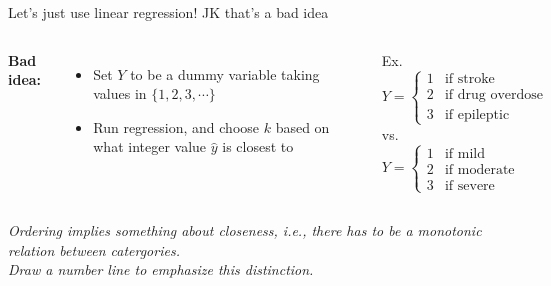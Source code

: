 \documentclass[aspectratio=169,usenames,dvipsnames]{beamer}
\newcommand{\InstructorNotes}[1]{\textit{\color{orange}#1}}
\begin{document}
	\begin{frame}[t]{Let's just use linear regression!}
		{JK that's a bad idea}
	
	\begin{columns}
	\centering
	\textbf{Bad idea:}
	\begin{itemize}
		\item Set $Y$ to be a dummy variable taking values in $\{1,2,3,\cdots\}$
		\item Run regression, and choose $k$ based on what integer value $\hat y$ is closest to
	\end{itemize}
	
	Ex.
	\begin{equation*}
		Y =
		\begin{cases}
			1 & \text{if stroke }\\
			2 & \text{if drug overdose }\\
			3 & \text{if epileptic seizure}
		\end{cases}
	\end{equation*}
	vs.
	\begin{equation*}
		Y =
		\begin{cases}
			1 & \text{if mild }\\
			2 & \text{if moderate }\\
			3 & \text{if severe}
		\end{cases}
	\end{equation*}
	\end{columns}
	\InstructorNotes{Ordering implies something about closeness, i.e., there has to be a monotonic relation between catergories. \\Draw a number line to emphasize this distinction. }
	\end{frame}
\end{document}
